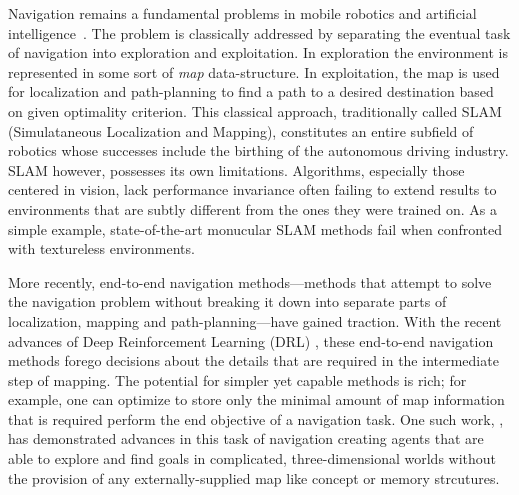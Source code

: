 
Navigation remains a fundamental problems in mobile robotics and artificial intelligence~\cite{SmChIJRR1986,ElCOMPUTER1980}.
The problem is classically addressed by separating the eventual task of navigation into exploration and exploitation. 
In exploration the environment is represented in some sort of \emph{map} data-structure. 
In exploitation, the map is used for localization and path-planning to find a path to a desired destination based on given optimality criterion. 
This classical approach, traditionally called SLAM (Simulataneous Localization and Mapping), constitutes an entire subfield of robotics whose successes include the birthing of the autonomous driving industry. 
SLAM however, possesses its own limitations. Algorithms, especially those centered in vision, lack performance invariance often failing to extend results to environments that are subtly different from the ones they were trained on. As a simple example, state-of-the-art monucular SLAM methods fail when confronted with textureless environments.

More recently, end-to-end navigation methods---methods that attempt to  
solve the navigation problem without breaking it down into separate parts of localization, mapping and path-planning---have gained traction.
%
With the recent advances of Deep Reinforcement Learning (DRL) \cite{MnKaSiNATURE2015}, these end-to-end navigation methods \cite{MnBaMiICML2016,SiHuMaNATURE2016,LePaKrISER2017,MiPaViICLR2017,OhChSiICML2016} forego decisions about the details that are required in the intermediate step of mapping.
The potential for simpler yet capable methods is rich; for example, one can optimize to store only the minimal amount of map information that is required perform the end objective of a navigation task.
One such work, \cite{MiPaViICLR2017}, has demonstrated advances in this task of navigation creating agents that are able to explore and find goals in complicated, three-dimensional worlds without the provision of any externally-supplied map like concept or memory strcutures. 

